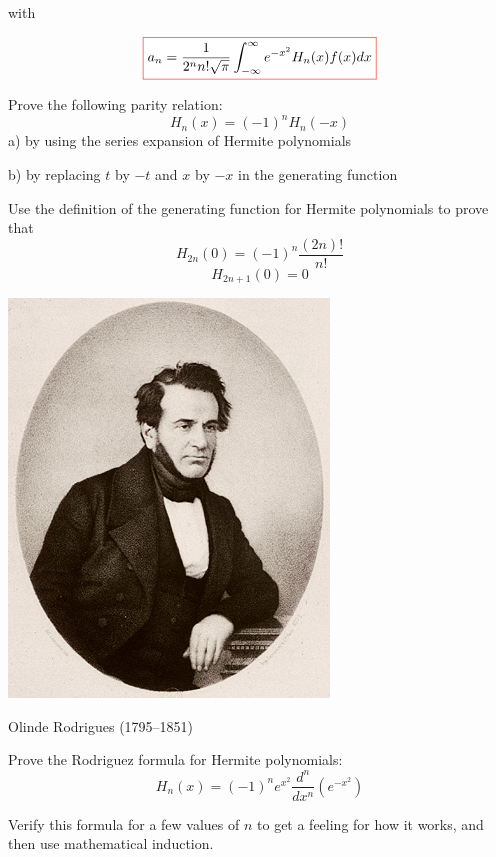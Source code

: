 with

\begin{equation}
\fbox{$\displaystyle
a_n = \frac{1}{2^n n!\sqrt{\pi}} \int_{-\infty}^{\infty} e^{-x^2} H_n(x) f(x) dx
$}
\end{equation} 


\begin{exer}
Prove the following parity relation:
$$H_n(x) = (-1)^nH_n(-x)$$
a) by using the series expansion of Hermite polynomials

b) by replacing $t$ by $-t$ and $x$ by $-x$ in the generating function
\end{exer}


\begin{exer}
Use the definition of the generating function for Hermite polynomials to prove that
$$H_{2n}(0) = (-1)^n \frac{(2n)!}{n!}$$
$$H_{2n+1}(0) = 0$$
\end{exer}

\begin{marginfigure}[0.0cm]
\includegraphics{hermite/figures/o_rodrigues}
\caption{Olinde Rodrigues (1795–1851)}
\end{marginfigure}

\begin{exer}
Prove the Rodriguez formula for Hermite polynomials:
$$H_n(x) = (-1)^n e^{x^2}\frac{d^n}{d x^n}\left(e^{-x^2}\right)$$
\begin{hnt}
 Verify this formula for a few values of $n$ to get a feeling for how it works, and then use mathematical induction.
\end{hnt}  
\end{exer}


